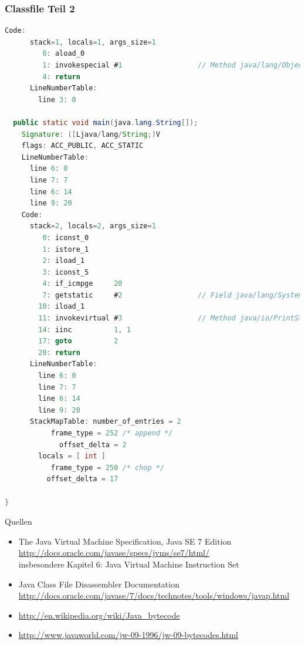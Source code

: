 \documentclass[10pt]{beamer}
\begin{document}
\begin{frame}
\frametitle{Classfile Teil 2}
\begin{lstlisting}[language=Java,basicstyle=\ttfamily\tiny,firstnumber=44]
    Code:
      stack=1, locals=1, args_size=1
         0: aload_0       
         1: invokespecial #1                  // Method java/lang/Object."<init>":()V
         4: return        
      LineNumberTable:
        line 3: 0

  public static void main(java.lang.String[]);
    Signature: ([Ljava/lang/String;)V
    flags: ACC_PUBLIC, ACC_STATIC
    LineNumberTable:
      line 6: 0
      line 7: 7
      line 6: 14
      line 9: 20
    Code:
      stack=2, locals=2, args_size=1
         0: iconst_0      
         1: istore_1      
         2: iload_1       
         3: iconst_5      
         4: if_icmpge     20
         7: getstatic     #2                  // Field java/lang/System.out:Ljava/io/PrintStream;
        10: iload_1       
        11: invokevirtual #3                  // Method java/io/PrintStream.println:(I)V
        14: iinc          1, 1
        17: goto          2
        20: return        
      LineNumberTable:
        line 6: 0
        line 7: 7
        line 6: 14
        line 9: 20
      StackMapTable: number_of_entries = 2
           frame_type = 252 /* append */
             offset_delta = 2
        locals = [ int ]
           frame_type = 250 /* chop */
          offset_delta = 17

}
\end{lstlisting}
\end{frame}


\begin{frame}{Quellen}
\begin{itemize}
\item The Java Virtual Machine Specification, Java SE 7 Edition\\
\url{http://docs.oracle.com/javase/specs/jvms/se7/html/}\\
insbesondere Kapitel 6: Java Virtual Machine Instruction Set
\item Java Class File Disassembler Documentation\\
\url{http://docs.oracle.com/javase/7/docs/technotes/tools/windows/javap.html}
\item \url{http://en.wikipedia.org/wiki/Java_bytecode}
\item \url{http://www.javaworld.com/jw-09-1996/jw-09-bytecodes.html}
\end{itemize}
\end{frame}
\end{document}
